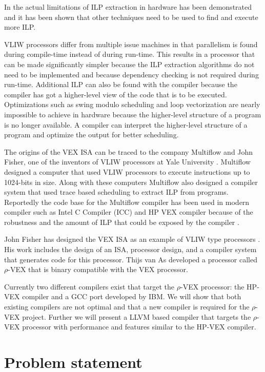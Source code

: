 In \cite{Wall:1993xy} the actual limitations of ILP extraction in hardware has been demonstrated and it has been shown that other techniques need to be used to find and execute more ILP.

VLIW processors differ from multiple issue machines in that parallelism is found during compile-time instead of during run-time. This results in a processor that can be made significantly simpler because the ILP extraction algorithms do not need to be implemented and because dependency checking is not required during run-time. Additional ILP can also be found with the compiler because the compiler has got a higher-level view of the code that is to be executed. Optimizations such as swing modulo scheduling and loop vectorization are nearly impossible to achieve in hardware because the higher-level structure of a program is no longer available. A compiler can interpret the higher-level structure of a program and optimize the output for better scheduling.

The origins of the VEX ISA can be traced to the company Multiflow and John Fisher, one of the inventors of VLIW processors at Yale University \cite{Fisher:1983:VLI:1067651.801649}. Multiflow designed a computer that used VLIW processors to execute instructions up to 1024-bits in size. Along with these computers Multiflow also designed a compiler system that used trace based scheduling to extract ILP from programs. Reportedly the code base for the Multiflow compiler has been used in modern compiler such as Intel C Compiler (ICC) and HP VEX compiler because of the robustness and the amount of ILP that could be exposed by the compiler \cite{Lowney:1993qy}.

John Fisher has designed the VEX ISA as an example of VLIW type processors \cite{Joseph-A.-Fisher:2005cr}. His work includes the design of an ISA, processor design, and a compiler system that generates code for this processor. Thijs van As developed a processor called $\rho$-VEX that is binary compatible with the VEX processor.

Currently two different compilers exist that target the $\rho$-VEX processor: the HP-VEX compiler and a GCC port developed by IBM. We will show that both existing compilers are not optimal and that a new compiler is required for the $\rho$-VEX project. Further we will present a LLVM based compiler that targets the $\rho$-VEX processor with performance and features similar to the HP-VEX compiler. 

\section{Problem statement}


